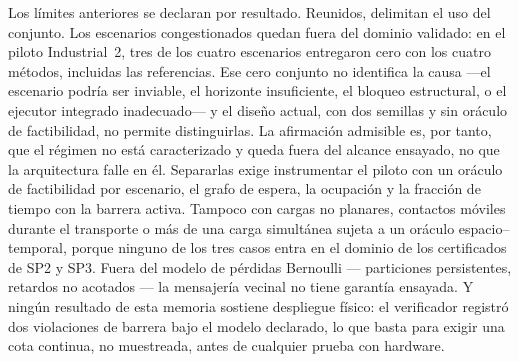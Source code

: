 Los límites anteriores se declaran por resultado. Reunidos, delimitan el uso del
conjunto. Los escenarios congestionados quedan fuera del dominio validado: en el
piloto Industrial~2, tres de los cuatro escenarios entregaron cero con los
cuatro métodos, incluidas las referencias. Ese cero conjunto no identifica la
causa ---el escenario podría ser inviable, el horizonte insuficiente, el
bloqueo estructural, o el ejecutor integrado inadecuado--- y el diseño actual,
con dos semillas y sin oráculo de factibilidad, no permite distinguirlas. La
afirmación admisible es, por tanto, que el régimen no está caracterizado y
queda fuera del alcance ensayado, no que la arquitectura falle en él.
Separarlas exige instrumentar el piloto con un oráculo de factibilidad por
escenario, el grafo de espera, la ocupación y la fracción de tiempo con la
barrera activa. Tampoco
con cargas no planares, contactos móviles durante el transporte o más de una
carga simultánea sujeta a un oráculo espacio--temporal, porque ninguno de los
tres casos entra en el dominio de los certificados de SP2 y SP3. Fuera del
modelo de pérdidas Bernoulli --- particiones persistentes, retardos no
acotados --- la mensajería vecinal no tiene garantía ensayada. Y ningún
resultado de esta memoria sostiene despliegue físico: el verificador registró
dos violaciones de barrera bajo el modelo declarado, lo que basta para exigir
una cota continua, no muestreada, antes de cualquier prueba con hardware.
